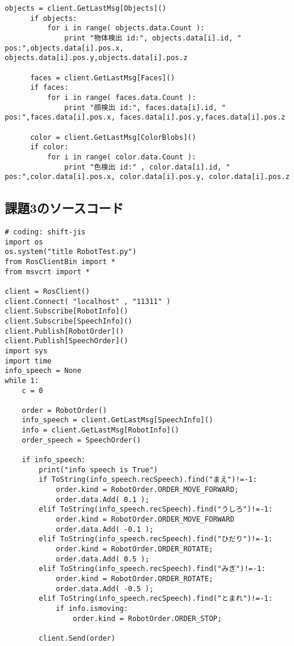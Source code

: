 \documentclass[10pt,a4j]{jsarticle}
\begin{document}
\begin{lstlisting}[caption=VisionTest.py, label=p4_txt]
      objects = client.GetLastMsg[Objects]()
      if objects:
          for i in range( objects.data.Count ):
              print "物体検出 id:", objects.data[i].id, " pos:",objects.data[i].pos.x, objects.data[i].pos.y,objects.data[i].pos.z
  
      faces = client.GetLastMsg[Faces]()
      if faces:
          for i in range( faces.data.Count ):
              print "顔検出 id:", faces.data[i].id, " pos:",faces.data[i].pos.x, faces.data[i].pos.y,faces.data[i].pos.z
  
      color = client.GetLastMsg[ColorBlobs]()
      if color:
          for i in range( color.data.Count ):
              print "色検出 id:" , color.data[i].id, " pos:",color.data[i].pos.x, color.data[i].pos.y, color.data[i].pos.z
\end{lstlisting}
  

\subsection{課題3のソースコード}
  \begin{lstlisting}[caption=RobotTest.py, label=p4_txt]
# coding: shift-jis
import os
os.system("title RobotTest.py")
from RosClientBin import *
from msvcrt import *

client = RosClient()
client.Connect( "localhost" , "11311" )
client.Subscribe[RobotInfo]()
client.Subscribe[SpeechInfo]()
client.Publish[RobotOrder]()
client.Publish[SpeechOrder]()
import sys
import time
info_speech = None
while 1:
    c = 0

    order = RobotOrder()
    info_speech = client.GetLastMsg[SpeechInfo]()
    info = client.GetLastMsg[RobotInfo]()
    order_speech = SpeechOrder()

    if info_speech:
        print("info speech is True")
        if ToString(info_speech.recSpeech).find("まえ")!=-1:
            order.kind = RobotOrder.ORDER_MOVE_FORWARD;
            order.data.Add( 0.1 );
        elif ToString(info_speech.recSpeech).find("うしろ")!=-1:
            order.kind = RobotOrder.ORDER_MOVE_FORWARD
            order.data.Add( -0.1 );
        elif ToString(info_speech.recSpeech).find("ひだり")!=-1:
            order.kind = RobotOrder.ORDER_ROTATE;
            order.data.Add( 0.5 );
        elif ToString(info_speech.recSpeech).find("みぎ")!=-1:
            order.kind = RobotOrder.ORDER_ROTATE;
            order.data.Add( -0.5 );
        elif ToString(info_speech.recSpeech).find("とまれ")!=-1:
            if info.ismoving:
                order.kind = RobotOrder.ORDER_STOP;

        client.Send(order)
\end{lstlisting}
\end{document}
